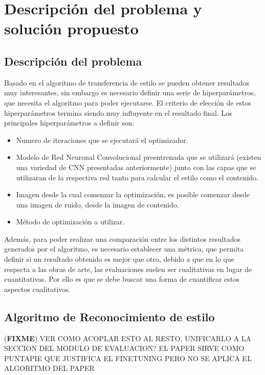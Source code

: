 \documentclass[a4paper,11pt,spanish]{book}
\newcommand*{\FIXME}[1]{{(\textbf{FIXME}) {#1}}}
\begin{document}
\chapter{Descripción del problema y solución propuesto}
  \section{Descripción del problema}
    Basado en el algoritmo de transferencia de estilo se pueden obtener resultados muy interesantes, sin embargo es necesario definir una serie de hiperparámetros,
    que necesita el algoritmo para poder ejecutarse. El criterio de elección de estos hiperparámetros termina siendo muy influyente en el resultado final.
    Los principales hiperparámetros a definir son:
    \begin{itemize}
      \item Numero de iteraciones que se ejecutará el optimizador.
      \item Modelo de Red Neuronal Convolucional preentrenada que se utilizará (existen una variedad de CNN presentadas anteriormente) junto con las capas que se utilizaran de la
      respectiva red tanto para calcular el estilo como el contenido.
      \item Imagen desde la cual comenzar la optimización, es posible comenzar desde una imagen de ruido, desde la imagen de contenido.
      \item Método de optimización a utilizar.
    \end{itemize}

    Además, para poder realizar una comparación entre los distintos resultados generados por el algoritmo, es necesario establecer una métrica, que permita definir si un resultado
    obtenido es mejor que otro, debido a que en lo que respecta a las obras de arte, las evaluaciones suelen ser cualitativas en lugar de cuantitativas. Por ello es que se debe
    buscar una forma de cuantificar estos aspectos cualitativos.

  \section{Algoritmo de Reconocimiento de estilo}
    \FIXME{VER COMO ACOPLAR ESTO AL RESTO, UNIFICARLO A LA SECCION DEL MODULO DE EVALUACION? EL PAPER SIRVE COMO PUNTAPIE QUE JUSTIFICA EL FINETUNING PERO NO SE APLICA EL ALGORITMO DEL PAPER}
\end{document}
